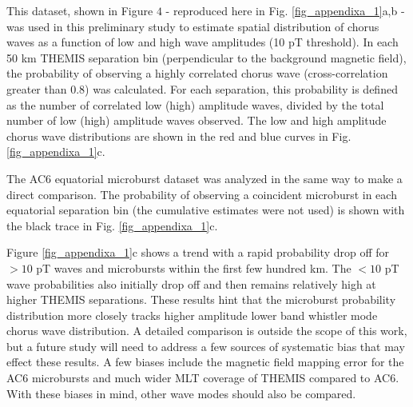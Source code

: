 \documentclass[draft]{agujournal2019}
\begin{document}
This dataset, shown in  Figure $4$ - reproduced here in Fig. \ref{fig_appendixa_1}a,b - was used in this preliminary study to estimate spatial distribution of chorus waves as a function of low and high wave amplitudes (10 pT threshold). In each 50 km THEMIS separation bin (perpendicular to the background magnetic field), the probability of observing a highly correlated chorus wave (cross-correlation greater than 0.8) was calculated. For each separation, this probability is defined as the number of correlated low (high) amplitude waves, divided by the total number of low (high) amplitude waves observed. The low and high amplitude chorus wave distributions are shown in the red and blue curves in  Fig. \ref{fig_appendixa_1}c.

The AC6 equatorial microburst dataset was analyzed in the same way to make a direct comparison. The probability of observing a coincident microburst in each equatorial separation bin (the cumulative estimates were not used) is shown with the black trace in Fig. \ref{fig_appendixa_1}c.

Figure \ref{fig_appendixa_1}c shows a trend with a rapid probability drop off for $> 10$ pT waves and microbursts within the first few hundred km. The $< 10$ pT wave probabilities also initially drop off and then remains relatively high at higher THEMIS separations. These results hint that the microburst probability distribution more closely tracks higher amplitude lower band whistler mode chorus wave distribution. A detailed comparison is outside the scope of this work, but a future study will need to address a few sources of systematic bias that may effect these results. A few biases include the magnetic field mapping error for the AC6 microbursts and much wider MLT coverage of THEMIS compared to AC6. With these biases in mind, other wave modes should also be compared.
\end{document}
